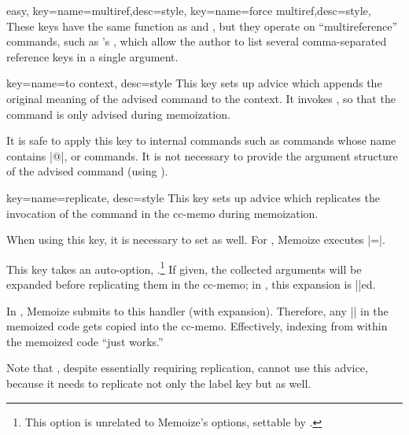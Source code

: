 \documentclass[a4paper,11pt]{article}
\begin{document}
\begin{doc}{easy, 
    key={name=multiref,desc=style},
    key={name=force multiref,desc=style},
  }
  These keys have the same function as  and , but they operate on ``multireference'' commands, such as
  's , which allow the author to list several
  comma-separated reference keys in a single argument.
\end{doc}

\begin{doc}{
    key={name=to context, desc=style}
  }
  This key sets up advice which appends the original meaning of the advised
  command to the context.  It invokes , so that
  the command is only advised during memoization.

  It is safe to apply this key to internal commands such as commands whose name
  contains |@|, or  commands.  It is not necessary to provide the
  argument structure of the advised command (using ).
  
\end{doc}

\begin{doc}{
    key={name=replicate, desc=style}
  }
  This key sets up advice which replicates the invocation of the command in
  the cc-memo during memoization.

  When using this key, it is necessary to set  as well.  For
  , Memoize executes
  |=\index|.

  This key takes an auto-option, .\footnote{This option is unrelated to Memoize's options,
    settable by .} If given, the collected arguments will be
  expanded before replicating them in the cc-memo; in , this
  expansion is |\protect|ed.

  In , Memoize submits  to this handler (with
  expansion).  Therefore, any || in the memoized code gets copied
  into the cc-memo.  Effectively, indexing from within the memoized code ``just
  works.''

  Note that , despite essentially requiring replication, cannot
  use this advice, because it needs to replicate not only the label key but
   as well.
\end{doc}
\end{document}
